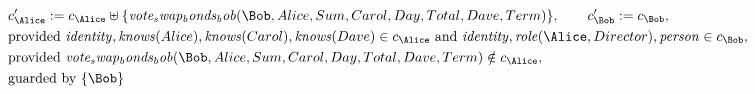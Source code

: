 \begin{align*}
&
c'_
{
\Alice
}
 := 
c_
{
\Alice
}
 \uplus 
\{
\mathit{
vote_swap_bonds_bob
}
(
\Bob
,
Alice
,
Sum
,
Carol
,
Day
,
Total
,
Dave
,
Term
)
\}
, \qquad 
c'_
{
\Bob
}
 := 
c_
{
\Bob
}
,\\
&
\text{provided } 
\mathit{
identity
}
,
\mathit{
knows
}
(
Alice
)
,
\mathit{
knows
}
(
Carol
)
,
\mathit{
knows
}
(
Dave
)
 \in c_
{
\Alice
}
 \text{ and } 
\mathit{
identity
}
,
\mathit{
role
}
(
\Alice
,
Director
)
,
\mathit{
person
}
 \in c_
{
\Bob
}
,\\
&
\text{provided } 
\mathit{
vote_swap_bonds_bob
}
(
\Bob
,
Alice
,
Sum
,
Carol
,
Day
,
Total
,
Dave
,
Term
)
 \notin c_
{
\Alice
}
,\\
&
\text{guarded by } \{
\Bob
\}
\end{align*}

